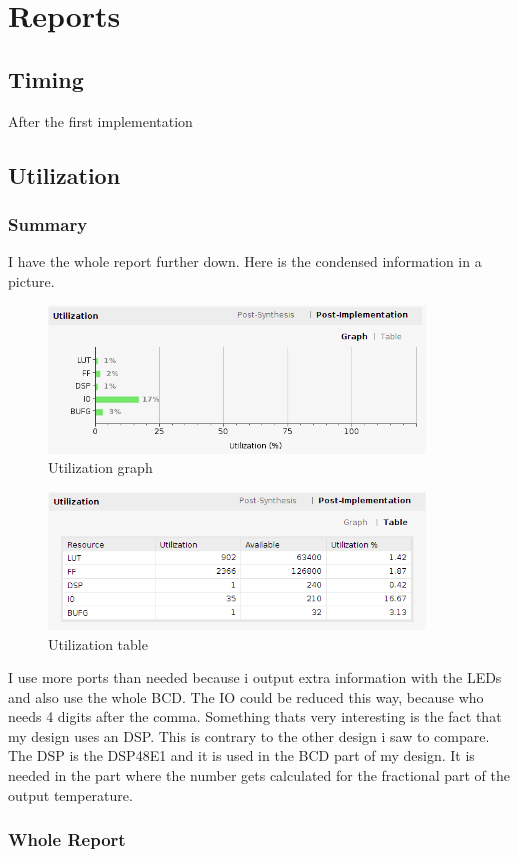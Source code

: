 \section{Reports}

\subsection{Timing}
After the first implementation


\subsection{Utilization}
\subsubsection{Summary}
I have the whole report further down. Here is the condensed information in a picture.
\begin{figure}[h!]
	\centering
	\includegraphics[width=10cm]{fig/utilizationgraph}
	\caption{Utilization graph}
\end{figure}
\begin{figure}[h!]
	\centering
	\includegraphics[width=10cm]{fig/utilizationtable}
	\caption{Utilization table}
\end{figure}

I use more ports than needed because i output extra information with the LEDs and also
use the whole BCD. The IO could be reduced this way, because who needs 4 digits after the
comma.
Something thats very interesting is the fact that my design uses an DSP. This is contrary to the other
design i saw to compare. The DSP is the
DSP48E1 and it is used in the BCD part of my design. It is needed in the part where the
number gets calculated for the fractional part of the output temperature.


\subsubsection{Whole Report}
